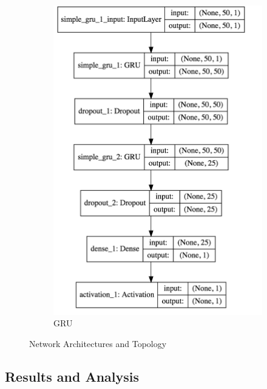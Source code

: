 \documentclass[11pt]{article}
\begin{document}
\begin{figure}
\begin{subfigure}[b]{0.3\textwidth}
        \includegraphics[width=\textwidth]{media/gru-network}
        \caption{GRU}
        \label{fig:gru-network}
    \end{subfigure}
    \caption{Network Architectures and Topology}\label{fig:network-architecture}
\end{figure}

\subsection{Results and Analysis} \label{sec:results}

\end{document}
